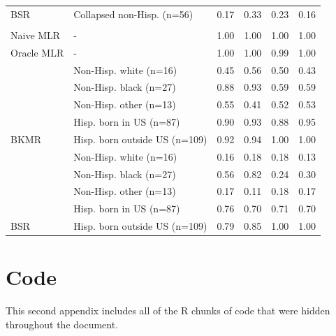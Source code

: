 \documentclass[12pt, twoside]{amherstthesis}
\begin{document}
\begin{table}
\begin{tabular}[t]{llcccc}
\multirow{-6}{*}{\raggedright\arraybackslash \hspace{1em}BSR} & Collapsed non-Hisp. (n=56) & 0.17 & 0.33 & 0.23 & 0.16\\
\addlinespace
\addlinespace[0.3em]
\multicolumn{6}{l}{\textbf{Large}}\\
\hspace{1em}Naive MLR & - & 1.00 & 1.00 & 1.00 & 1.00\\
\addlinespace
\hspace{1em}Oracle MLR & - & 1.00 & 1.00 & 0.99 & 1.00\\
\addlinespace
 & Non-Hisp. white (n=16) & 0.45 & 0.56 & 0.50 & 0.43\\

 & Non-Hisp. black (n=27) & 0.88 & 0.93 & 0.59 & 0.59\\

 & Non-Hisp. other (n=13) & 0.55 & 0.41 & 0.52 & 0.53\\

 & Hisp. born in US (n=87) & 0.90 & 0.93 & 0.88 & 0.95\\

\multirow{-5}{*}{\raggedright\arraybackslash \hspace{1em}BKMR} & Hisp. born outside US (n=109) & 0.92 & 0.94 & 1.00 & 1.00\\
\addlinespace
 & Non-Hisp. white (n=16) & 0.16 & 0.18 & 0.18 & 0.13\\

 & Non-Hisp. black (n=27) & 0.56 & 0.82 & 0.24 & 0.30\\

 & Non-Hisp. other (n=13) & 0.17 & 0.11 & 0.18 & 0.17\\

 & Hisp. born in US (n=87) & 0.76 & 0.70 & 0.71 & 0.70\\

\multirow{-5}{*}{\raggedright\arraybackslash \hspace{1em}BSR} & Hisp. born outside US (n=109) & 0.79 & 0.85 & 1.00 & 1.00\\
\bottomrule
\end{tabular}
\end{table}
\hypertarget{code}{%
\chapter{Code}\label{code}}

This second appendix includes all of the R chunks of code that were hidden throughout the document.
\end{document}
